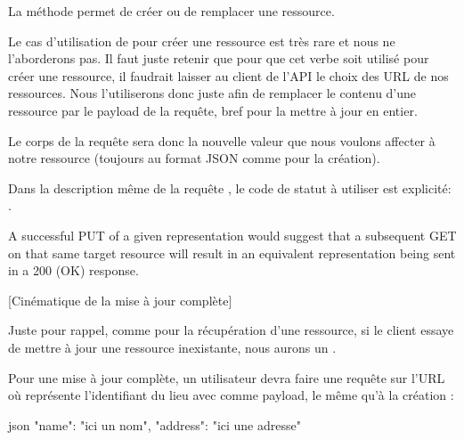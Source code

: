 \documentclass[big]{zmdocument}
\begin{document}
La méthode  permet de créer ou de remplacer une ressource.



Le cas d'utilisation de  pour créer une ressource est très rare et nous ne l'aborderons pas. Il faut juste retenir que pour que cet verbe soit utilisé pour créer une ressource, il faudrait laisser au client de l'API le choix des URL de nos ressources.
Nous l'utiliserons donc juste afin de remplacer le contenu d'une ressource par le payload de la requête, bref pour la mettre à jour en entier.





Le corps de la requête sera donc la nouvelle valeur que nous voulons affecter à notre ressource (toujours au format JSON comme pour la création).





Dans la description même de la requête , le code de statut à utiliser est explicité: .



\begin{Quotation}
A successful PUT of a given representation would suggest that a subsequent GET on that same target resource will result in an equivalent representation being sent in a 200 (OK) response.
\end{Quotation}



[Cinématique de la mise à jour complète]


\begin{Information}
Juste pour rappel, comme pour la récupération d'une ressource, si le client essaye de mettre à jour une ressource inexistante, nous aurons un .
\end{Information}




Pour une mise à jour complète, un utilisateur devra faire une requête  sur l'URL  où  représente l'identifiant du lieu avec comme payload, le même qu'à la création :



\begin{CodeBlock}{json}
{
    "name": "ici un nom",
    "address": "ici une adresse"
}
\end{CodeBlock}
\end{document}
